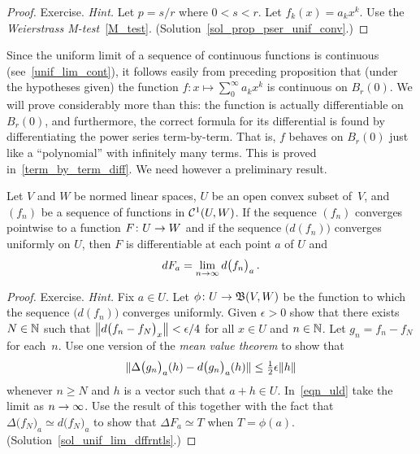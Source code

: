 \begin{proof} Exercise. \emph{Hint.} Let $p = s/r$ where $0 < s < r$.  Let $f_k(x) = a_kx^k$.
Use the \emph{Weierstrass M-test}~\ref{M_test}.  (Solution~\ref{sol_prop_pser_unif_conv}.) \ns
\end{proof}

Since the uniform limit of a sequence of continuous functions is continuous
(see~\ref{unif_lim_cont}), it follows easily from preceding proposition that (under the
hypotheses given) the function $f\colon x \mapsto \sum_0^\infty a_kx^k$ is continuous on
$B_r(0)$.  We will prove considerably more than this: the function is actually differentiable
on $B_r(0)$, and furthermore, the correct formula for its differential is found by
differentiating the power series term-by-term.  That is, $f$ behaves on $B_r(0)$ just like a
``polynomial'' with infinitely many terms.  This is proved in~\ref{term_by_term_diff}.  We
need however a preliminary result.

\begin{prop}\label{unif_lim_dffrntls}  Let $V$ and $W$ be normed linear spaces, $U$ be an open
convex subset of~$V$, and $(f_n)$ be a sequence of functions in $\mathcal{C}^1(U,W)$.  If the
sequence $(f_n)$ converges pointwise to a function $F\colon U \rightarrow W$ and if the sequence
$\bigl(d(f_n)\bigr)$ converges uniformly on $U$, then $F$ is differentiable at each point $a$
of $U$ and
  \[ dF_a = \lim_{n \rightarrow \infty} d\bigl(f_n\bigr)_a\,. \]
\end{prop}

\begin{proof}  Exercise. \emph{Hint.} Fix $a \in U$.  Let
$\phi\colon U \rightarrow \mathfrak{B}(V,W)$ be the function to which the sequence $\bigl(d(f_n)\bigr)$
converges uniformly. Given $\epsilon
> 0$ show that there exists $N \in \mathbb{N}$ such that
$\left\lVert d\bigl(f_n - f_N\bigr)_x\right\rVert < \epsilon/4$ for all $x \in
U$ and $n \in \mathbb{N}$.  Let $g_n = f_n - f_N$ for each~$n$.  Use one
version of the \emph{mean value theorem} to show that
\begin{equation}\label{eqn_uld}
   \lVert\Delta\bigl(g_n\bigr)_a(h) - d\bigl(g_n\bigr)_a(h)\rVert
                \le \textstyle{\frac12}\epsilon\lVert h\rVert
\end{equation}
whenever $n \ge N$ and $h$ is a vector such that $a + h \in U$. In~\eqref{eqn_uld} take the
limit as $n \rightarrow \infty$.  Use the result of this together with the fact that
$\Delta\bigl(f_N\bigr)_a \simeq d\bigl(f_N\bigr)_a$ to show that $\Delta F_a \simeq T$ when $T
= \phi(a)$.  (Solution~\ref{sol_unif_lim_dffrntls}.)   \ns
\end{proof}

